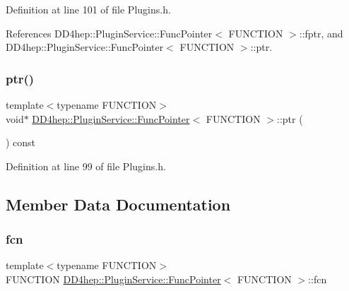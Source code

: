 Definition at line 101 of file Plugins.\+h.



References D\+D4hep\+::\+Plugin\+Service\+::\+Func\+Pointer$<$ F\+U\+N\+C\+T\+I\+O\+N $>$\+::fptr, and D\+D4hep\+::\+Plugin\+Service\+::\+Func\+Pointer$<$ F\+U\+N\+C\+T\+I\+O\+N $>$\+::ptr.

\hypertarget{struct_d_d4hep_1_1_plugin_service_1_1_func_pointer_ad6d585ac1955a3d6671ae0f158f76266}{}\label{struct_d_d4hep_1_1_plugin_service_1_1_func_pointer_ad6d585ac1955a3d6671ae0f158f76266} 
\subsubsection{\texorpdfstring{ptr()}{ptr()}}
{\footnotesize\ttfamily template$<$typename F\+U\+N\+C\+T\+I\+ON$>$ \\
void$\ast$ \hyperlink{struct_d_d4hep_1_1_plugin_service_1_1_func_pointer}{D\+D4hep\+::\+Plugin\+Service\+::\+Func\+Pointer}$<$ F\+U\+N\+C\+T\+I\+ON $>$\+::ptr (\begin{DoxyParamCaption}{ }\end{DoxyParamCaption}) const\hspace{0.3cm}{\ttfamily [inline]}}



Definition at line 99 of file Plugins.\+h.



\subsection{Member Data Documentation}
\hypertarget{struct_d_d4hep_1_1_plugin_service_1_1_func_pointer_a1858e4504eb3117ff82f6c7c418ff386}{}\label{struct_d_d4hep_1_1_plugin_service_1_1_func_pointer_a1858e4504eb3117ff82f6c7c418ff386} 
\subsubsection{\texorpdfstring{fcn}{fcn}}
{\footnotesize\ttfamily template$<$typename F\+U\+N\+C\+T\+I\+ON$>$ \\
F\+U\+N\+C\+T\+I\+ON \hyperlink{struct_d_d4hep_1_1_plugin_service_1_1_func_pointer}{D\+D4hep\+::\+Plugin\+Service\+::\+Func\+Pointer}$<$ F\+U\+N\+C\+T\+I\+ON $>$\+::fcn}



